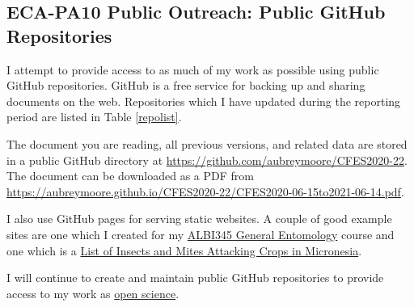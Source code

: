 \subsection{ECA-PA10 Public Outreach: Public GitHub Repositories}

I attempt to provide access to as much of my work as possible using public GitHub repositories. GitHub is a free service for backing up and sharing documents on the web. Repositories which I have updated during the reporting period are listed in Table \ref{repolist}. 

The document you are reading, all previous versions, and related data are stored in a public GitHub directory at \url{https://github.com/aubreymoore/CFES2020-22}. The document can be downloaded as a PDF from
\url{https://aubreymoore.github.io/CFES2020-22/CFES2020-06-15to2021-06-14.pdf}.

I also use GitHub pages for serving static websites. A couple of good example sites are one which I created for my \href{https://aubreymoore.github.io/ALBI-345/}{ALBI345 General Entomology} course and one which is a \href{https://aubreymoore.github.io/crop-pest-list/}{List of Insects and Mites Attacking Crops in Micronesia}.

I will continue to create and maintain public GitHub repositories to provide access to my work as \href{https://en.wikipedia.org/wiki/Open_science}{open science}.

